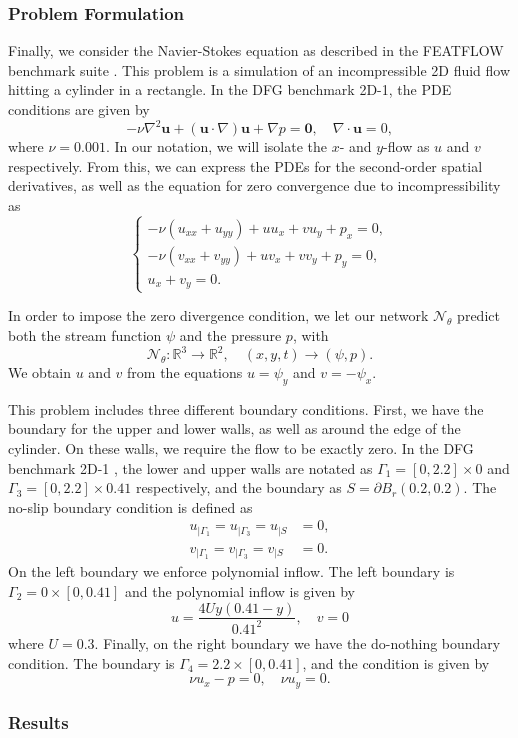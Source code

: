 \subsubsection{Problem Formulation}
Finally, we consider the Navier-Stokes equation as described in the FEATFLOW benchmark suite \cite{DFG}.
This problem is a simulation of an incompressible 2D fluid flow hitting a cylinder in a rectangle.
In the DFG benchmark 2D-1, the PDE conditions are given by
\begin{equation} \label{eq:NS}
    -\nu \nabla^2 \mathbf{u} + (\mathbf{u} \cdot \nabla)\mathbf{u} + \nabla p = \mathbf{0}, \quad \nabla \cdot \mathbf{u} = 0,
\end{equation}
where $\nu = 0.001$.
In our notation, we will isolate the $x$- and $y$-flow as $u$ and $v$ respectively.
From this, we can express the PDEs for the second-order spatial derivatives, as well as the equation for zero convergence due to incompressibility as
\begin{equation}
\begin{cases}
-\nu(u_{xx} + u_{yy})+uu_x+vu_y+p_x = 0, \\
-\nu(v_{xx} + v_{yy})+uv_x+vv_y+p_y = 0, \\
u_x + v_y = 0.
\end{cases}
\end{equation}

In order to impose the zero divergence condition, we let our network $\mathcal{N}_\theta$ predict both the stream function $\psi$ and the pressure $p$, with
\begin{equation}
    \mathcal{N}_\theta : \mathbb{R}^3 \to \mathbb{R}^2, \quad (x,y,t)\to (\psi, p).
\end{equation}
We obtain $u$ and $v$ from the equations $u=\psi_y$ and $v=-\psi_x$.

This problem includes three different boundary conditions.
First, we have the boundary for the upper and lower walls, as well as around the edge of the cylinder.
On these walls, we require the flow to be exactly zero.
In the DFG benchmark 2D-1 \cite{DFG}, the lower and upper walls are notated as $\Gamma_1 = [0,2.2]\times 0$ and $\Gamma_3 = [0,2.2]\times 0.41$ respectively, and the boundary as $S=\partial B_r(0.2,0.2)$.
The no-slip boundary condition is defined as
\begin{align*}
    u_{|\Gamma_1} = u_{|\Gamma_3} = u_{|S} &= 0, \\
    v_{|\Gamma_1} = v_{|\Gamma_3} = v_{|S} &= 0.
\end{align*}
On the left boundary we enforce polynomial inflow.
The left boundary is $\Gamma_2 = 0\times [0,0.41]$ and the polynomial inflow is given by
\begin{equation*}
    u=\frac{4Uy(0.41-y)}{0.41^2}, \quad v=0
\end{equation*}
where $U=0.3$.
Finally, on the right boundary we have the do-nothing boundary condition.
The boundary is $\Gamma_4=2.2\times[0,0.41]$, and the condition is given by
\begin{equation*}
    \nu u_x - p = 0, \quad \nu u_y = 0.
\end{equation*}

\subsubsection{Results}